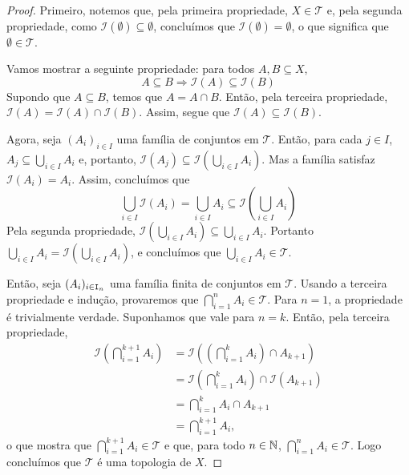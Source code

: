 \begin{proof}
	Primeiro, notemos que, pela primeira propriedade, $X \in \mathcal T$ e, pela segunda propriedade, como $\mathcal I(\emptyset) \subseteq \emptyset$, concluímos que $\mathcal I(\emptyset)=\emptyset$, o que significa que $\emptyset \in \mathcal T$. 	
	
	Vamos mostrar a seguinte propriedade: para todos $A,B \subseteq X$,
	\begin{equation*}
	A \subseteq B \Rightarrow \mathcal I(A) \subseteq \mathcal I(B)
	\end{equation*}
Supondo que $A \subseteq B$, temos que $A = A \cap B$. Então, pela terceira propriedade, $\mathcal I(A) = \mathcal I(A) \cap \mathcal I(B)$. Assim, segue que $\mathcal I(A) \subseteq \mathcal I(B)$.	
	
Agora, seja $(A_i)_{i \in I}$ uma família de conjuntos em $\mathcal T$. Então, para cada $j \in I$, $A_j \subseteq \bigcup_{i \in I} A_i$ e, portanto, $\mathcal I(A_j) \subseteq \mathcal I(\bigcup_{i \in I} A_i)$. Mas a família satisfaz $\mathcal I(A_i) = A_i$. Assim, concluímos que
	\begin{equation*}
	\bigcup_{i \in I} \mathcal I(A_i) = \bigcup_{i \in I} A_i \subseteq \mathcal I \left( \bigcup_{i \in I} A_i \right)
	\end{equation*}
Pela segunda propriedade, $\mathcal I(\bigcup_{i \in I} A_i) \subseteq \bigcup_{i \in I} A_i$. Portanto $\bigcup_{i \in I} A_i = \mathcal I(\bigcup_{i \in I} A_i )$, e concluímos que $\bigcup_{i \in I} A_i \in \mathcal T$.
	
	Então, seja $(A_i)_{i \in \mathtt I_n}$ uma família finita de conjuntos em $\mathcal T$. Usando a terceira propriedade e indução, provaremos que $\bigcap_{i=1}^{n} A_i \in \mathcal T$. Para $n=1$, a propriedade é trivialmente verdade. Suponhamos que vale para $n=k$. Então, pela terceira propriedade,
	\begin{align*}
	\mathcal I \left( \bigcap_{i=1}^{k+1} A_i \right)
	&= \mathcal I \left( \left( \bigcap_{i=1}^{k} A_i \right) \cap A_{k+1} \right) \\
	&= \mathcal I \left( \bigcap_{i=1}^{k} A_i \right) \cap \mathcal I \left( A_{k+1} \right) \\
	&= \bigcap_{i=1}^{k} A_i \cap A_{k+1} \\
	&= \bigcap_{i=1}^{k+1} A_i,
	\end{align*}
o que mostra que $\bigcap_{i=1}^{k+1} A_i \in \mathcal T$ e que, para todo $n \in \mathbb{N}$, $\bigcap_{i=1}^{n} A_i \in \mathcal T$. Logo concluímos que $\mathcal T$ é uma topologia de $X$.


\end{proof}
